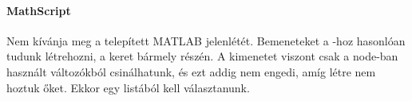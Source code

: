 \documentclass[../../main.tex]{subfiles}
\begin{document}
\paragraph*{MathScript}
Nem kívánja meg a telepített MATLAB jelenlétét. Bemeneteket a -hoz
hasonlóan tudunk létrehozni, a keret bármely részén. A kimenetet viszont csak
a node-ban használt változókból csinálhatunk, és ezt addig nem engedi, amíg
létre nem hoztuk őket. Ekkor egy listából kell választanunk.



\end{document}
